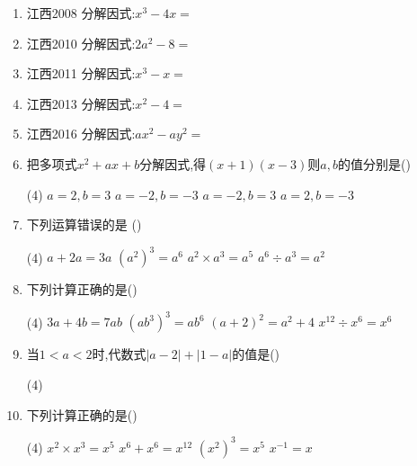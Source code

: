 \documentclass[cn,blue]{elegantbook}
\begin{document}
\begin{problem}
    \begin{enumerate}
        \item 江西2008 分解因式:\(x^3-4x=\)
        \item 江西2010 分解因式:\(2a^2-8=\)
        \item 江西2011 分解因式:\(x^3-x=\)
        \item 江西2013 分解因式:\(x^2-4=\)
        \item 江西2016 分解因式:\(ax^2-ay^2=\)
        \item 把多项式\(x^2+ax+b\)分解因式,得\((x+1)(x-3)\)则\(a,b\)的值分别是(\qquad)\\
            \begin{tasks}(4) 
                \task \(a=2,b=3\)
                \task \(a=-2,b=-3\)
                \task \(a=-2,b=3\)
                \task \(a=2,b=-3\)
            \end{tasks}
        \item 下列运算错误的是 (\qquad)\\
            \begin{tasks}(4) 
                \task \(a+2a=3a\)
                \task \((a^2)^3=a^6\)
                \task \(a^2 \times a^3=a^5\)
                \task \(a^6 \div a^3=a^2\)
            \end{tasks}
        \item 下列计算正确的是(\qquad)\\
            \begin{tasks}(4) 
                \task \(3a+4b=7ab\)
                \task \((ab^3)^3=ab^6\)
                \task \((a+2)^2=a^2+4\)
                \task \(x^{12} \div x^6=x^6\)
            \end{tasks}
        \item 当\(1<a<2\)时,代数式\(|a-2|+|1-a|\)的值是(\qquad)\\
            \begin{tasks}(4) 
            \end{tasks}
        \item 下列计算正确的是(\qquad)\\
            \begin{tasks}(4) 
            \task \(x^2 \times x^3=x^5\)
                \task \(x^6+x^6=x^{12}\)
                \task \((x^2)^3=x^5\)
                \task \(x^{-1}=x\)
            \end{tasks}

\end{enumerate}
\end{problem}
\end{document}
